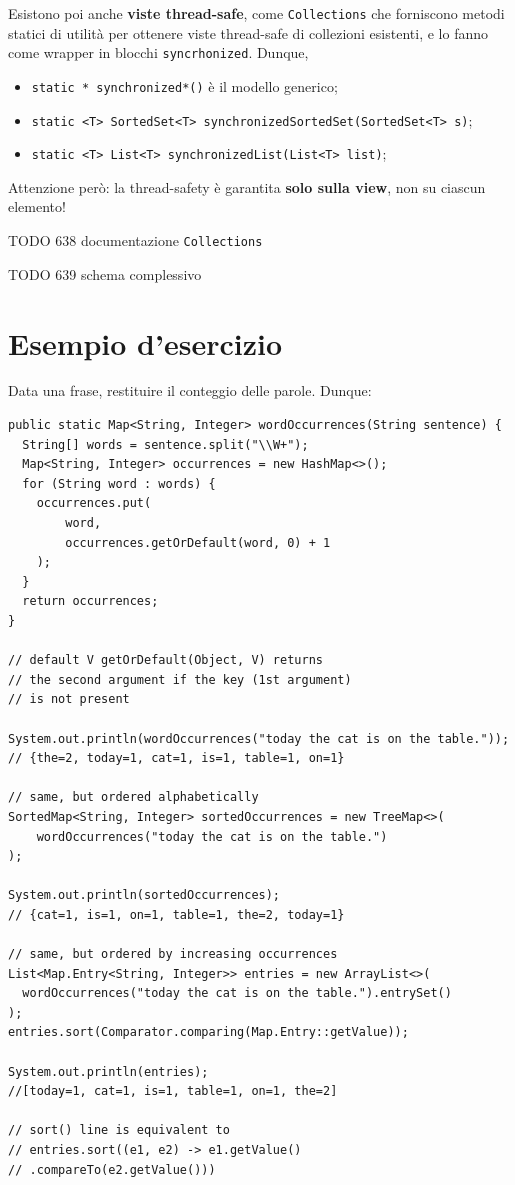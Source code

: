 \documentclass[\fontsizeclass,twocolumn]{\classname}
\theoremstyle{definition}
\theoremstyle{definition}
\begin{document}
Esistono poi anche \textbf{viste thread\--safe}, come \texttt{Collections} che
forniscono metodi statici di utilità per ottenere viste thread\--safe di
collezioni esistenti, e lo fanno come wrapper in blocchi \texttt{syncrhonized}. Dunque,
\begin{itemize}
    \item \texttt{static * synchronized*()} è il modello generico;
    \item \texttt{static <T> SortedSet<T> synchronizedSortedSet(SortedSet<T> s)};
    \item \texttt{static <T> List<T> synchronizedList(List<T> list)};
\end{itemize}

Attenzione però: la thread\--safety è garantita \textbf{solo sulla view}, non
su ciascun elemento!

TODO 638 documentazione \texttt{Collections}

TODO 639 schema complessivo

\section{Esempio d'esercizio}

Data una frase, restituire il conteggio delle parole. Dunque:



\begin{lstlisting}
public static Map<String, Integer> wordOccurrences(String sentence) {
  String[] words = sentence.split("\\W+");
  Map<String, Integer> occurrences = new HashMap<>();
  for (String word : words) {
    occurrences.put(
        word,
        occurrences.getOrDefault(word, 0) + 1
    );
  }
  return occurrences;
}

// default V getOrDefault(Object, V) returns 
// the second argument if the key (1st argument) 
// is not present

System.out.println(wordOccurrences("today the cat is on the table."));
// {the=2, today=1, cat=1, is=1, table=1, on=1}

// same, but ordered alphabetically
SortedMap<String, Integer> sortedOccurrences = new TreeMap<>(
    wordOccurrences("today the cat is on the table.")
);

System.out.println(sortedOccurrences);
// {cat=1, is=1, on=1, table=1, the=2, today=1}

// same, but ordered by increasing occurrences
List<Map.Entry<String, Integer>> entries = new ArrayList<>(
  wordOccurrences("today the cat is on the table.").entrySet()
);
entries.sort(Comparator.comparing(Map.Entry::getValue));

System.out.println(entries);
//[today=1, cat=1, is=1, table=1, on=1, the=2]

// sort() line is equivalent to 
// entries.sort((e1, e2) -> e1.getValue()
// .compareTo(e2.getValue()))
\end{lstlisting}
\end{document}
